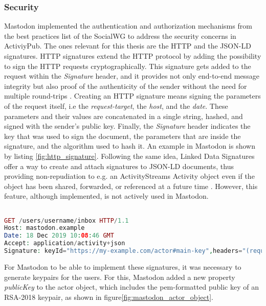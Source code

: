 \subsubsection{Security}
Mastodon implemented the authentication and authorization mechanisms from the best practices list of the SocialWG to address the security concerns in ActiviyPub. The ones relevant for this thesis are the HTTP and the JSON-LD signatures. HTTP signatures extend the HTTP protocol by adding the possibility to sign the HTTP requests cryptographically. This signature gets added to the request within the \emph{Signature} header, and it provides not only end-to-end message integrity but also proof of the authenticity of the sender without the need for multiple round-trips \cite{cavage_sporny_2019}. Creating an HTTP signature means signing the parameters of the request itself, i.e the \emph{request-target}, the \emph{host}, and the \emph{date}. These parameters and their values are concatenated in a single string, hashed, and signed with the sender's public key. Finally, the \emph{Signature} header indicates the key that was used to sign the document, the parameters that are inside the signature, and the algorithm used to hash it. An example in Mastodon is shown by listing \ref{fig:http_signature}. 
Following the same idea, Linked Data Signatures offer a way to create and attach signatures to JSON-LD documents, thus providing non-repudiation to e.g. an ActivityStreams Activity object even if the object has been shared, forwarded, or referenced at a future time \cite{celik_prodromou_le_hors_2014}. However, this feature, although implemented, is not actively used in Mastodon.

\lstset{style=JSONStyle}
\begin{lstlisting}[language=PHP, caption=Signed HTTP Request, label=fig:http_signature, float=h]

GET /users/username/inbox HTTP/1.1
Host: mastodon.example
Date: 18 Dec 2019 10:08:46 GMT
Accept: application/activity+json
Signature: keyId="https://my-example.com/actor#main-key",headers="(request-target) host date",signature="Y2FiYW...IxNGRiZDk4ZA=="

\end{lstlisting}

For Mastodon to be able to implement these signatures, it was necessary to generate keypairs for the users. For this, Mastodon added a new property \emph{publicKey} to the actor object, which includes the pem-formatted public key of an RSA-2018 keypair, as shown in figure\ref{fig:mastodon_actor_object}.

